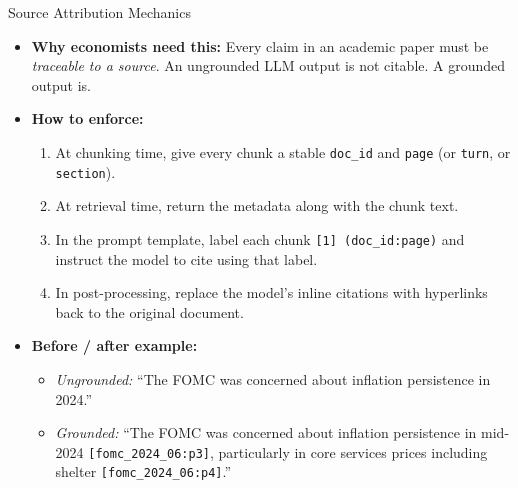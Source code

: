 \begin{frame}{Source Attribution Mechanics}
\begin{itemize}
\item \textbf{Why economists need this:} Every claim in an academic paper must be \emph{traceable to a source}. An ungrounded LLM output is not citable. A grounded output is.

\medskip
\item \textbf{How to enforce:}
\begin{enumerate}
    \item At chunking time, give every chunk a stable \texttt{doc\_id} and \texttt{page} (or \texttt{turn}, or \texttt{section}).
    \item At retrieval time, return the metadata along with the chunk text.
    \item In the prompt template, label each chunk \texttt{[1] (doc\_id:page)} and instruct the model to cite using that label.
    \item In post-processing, replace the model's inline citations with hyperlinks back to the original document.
\end{enumerate}

\medskip
\item \textbf{Before / after example:}
\begin{itemize}
    \item \emph{Ungrounded:} ``The FOMC was concerned about inflation persistence in 2024.''
    \item \emph{Grounded:} ``The FOMC was concerned about inflation persistence in mid-2024 \texttt{[fomc\_2024\_06:p3]}, particularly in core services prices including shelter \texttt{[fomc\_2024\_06:p4]}.''
\end{itemize}
\end{itemize}
\end{frame}

